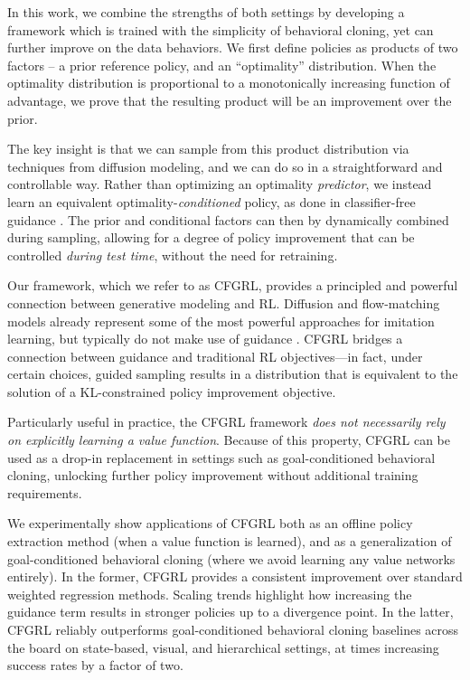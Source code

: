 \documentclass{article}
\begin{document}
In this work, we combine the strengths of both settings by developing a framework which is trained with the simplicity of behavioral cloning, yet can further improve on the data behaviors. We first define policies as products of two factors -- a prior reference policy, and an ``optimality'' distribution. When the optimality distribution is proportional to a monotonically increasing function of advantage, we prove that the resulting product will be an improvement over the prior. 

The key insight is that we can sample from this product distribution via techniques from diffusion modeling, and we can do so in a straightforward and controllable way. Rather than optimizing an optimality \textit{predictor}, we instead learn an equivalent optimality-\textit{conditioned} policy, as done in classifier-free guidance \citep{cfg_ho2022}. The prior and conditional factors can then by dynamically combined during sampling, allowing for a degree of policy improvement that can be controlled \textit{during test time}, without the need for retraining. 

Our framework, which we refer to as CFGRL, provides a principled and powerful connection between generative modeling and RL. Diffusion and flow-matching models already represent some of the most powerful approaches for imitation learning, but typically do not make use of guidance \citep{pi0_black2024, diffusionpolicy_chi2023}. CFGRL bridges a connection between guidance and traditional RL objectives---in fact, under certain choices, guided sampling results in a distribution that is equivalent to the solution of a KL-constrained policy improvement objective.

Particularly useful in practice, the CFGRL framework \textit{does not necessarily rely on explicitly learning a value function}. Because of this property, CFGRL can be used as a drop-in replacement in settings such as goal-conditioned behavioral cloning, unlocking further policy improvement without additional training requirements. 


We experimentally show applications of CFGRL both as an offline policy extraction method (when a value function is learned), and as a generalization of goal-conditioned behavioral cloning (where we avoid learning any value networks entirely). In the former, CFGRL provides a consistent improvement over standard weighted regression methods. Scaling trends highlight how increasing the guidance term results in stronger policies up to a divergence point. In the latter, CFGRL reliably outperforms goal-conditioned behavioral cloning baselines across the board on state-based, visual, and hierarchical settings, at times increasing success rates by a factor of two.
\end{document}
